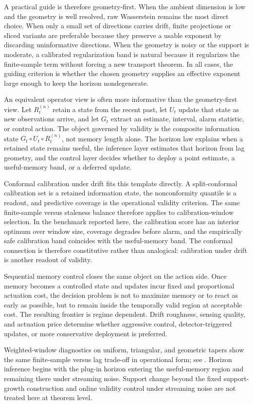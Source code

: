 A practical guide is therefore geometry-first. When the ambient dimension is low
and the geometry is well resolved, raw Wasserstein remains the most direct
choice. When only a small set of directions carries drift, finite projections or
sliced variants are preferable because they preserve a usable exponent by
discarding uninformative directions. When the geometry is noisy or the support
is moderate, a calibrated regularization band is natural because it regularizes
the finite-sample term without forcing a new transport theorem. In all cases,
the guiding criterion is whether the chosen geometry supplies an effective
exponent large enough to keep the horizon nondegenerate.

An equivalent operator view is often more informative than the geometry-first
view. Let $R_t^{(n)}$ retain a state from the recent past, let $U_t$ update that
state as new observations arrive, and let $G_t$ extract an estimate, interval,
alarm statistic, or control action. The object governed by validity is
the composite information state $G_t\circ U_t\circ R_t^{(n)}$, not memory length
alone. The horizon law explains when a retained state remains useful, the
inference layer estimates that horizon from lag geometry, and the control layer
decides whether to deploy a point estimate, a useful-memory band, or a deferred
update.

Conformal calibration under drift fits this template directly. A split-conformal
calibration set is a retained information state, the nonconformity quantile is a
readout, and predictive coverage is the operational validity criterion. The same
finite-sample versus staleness balance therefore applies to calibration-window
selection. In the benchmark reported here, the calibration score has an interior
optimum over window size, coverage degrades before alarm, and the empirically
safe calibration band coincides with the useful-memory band. The conformal
connection is therefore constitutive rather than analogical: calibration under
drift is another readout of validity.

Sequential memory control closes the same object on the action side. Once memory
becomes a controlled state and updates incur fixed and proportional actuation
cost, the decision problem is not to maximize memory or to react as early as
possible, but to remain inside the temporally valid region at acceptable cost.
The resulting frontier is regime dependent. Drift roughness, sensing quality,
and actuation price determine whether aggressive control, detector-triggered
updates, or more conservative deployment is preferred.

Weighted-window diagnostics on uniform, triangular, and geometric tapers show
the same finite-sample versus lag trade-off in operational form; see
. Horizon inference begins with the plug-in
horizon entering the useful-memory region and remaining there under streaming
noise. Support change beyond the fixed support-growth construction and online
validity control under streaming noise are not treated here at theorem level.
